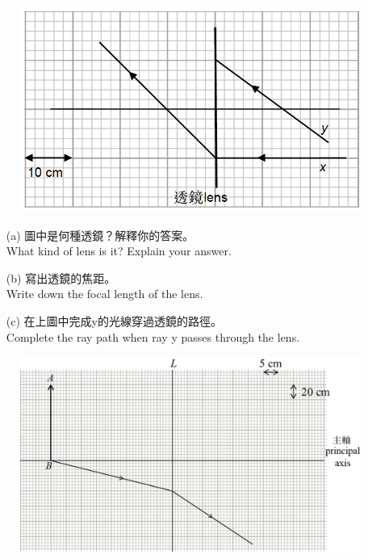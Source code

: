 \documentclass[beamer=true]{standalone}
\begin{document}
\begin{eg}
    \begin{figure}
        \centering
        \includegraphics[width=0.95\linewidth]{assets/odijdoid.png}


    \end{figure}

\end{eg}

\begin{eg}
    \begin{itemize}
        \item [(a)] 圖中是何種透鏡？解釋你的答案。\\What kind of lens is it? Explain your answer.\vspace{3cm}
        \item [(b)] 寫出透鏡的焦距。\\ Write down the focal length of the lens.\vspace{1cm}
        \item [(c)] 在上圖中完成y的光線穿過透鏡的路徑。\\Complete the ray path when ray y passes through the lens.
    \end{itemize}
\end{eg}

\begin{eg}
    \begin{figure}
        \centering
        \includegraphics[width=1\linewidth]{assets/89dnu832d9832d98un32.png}
    \end{figure}
\end{eg}
\end{document}
